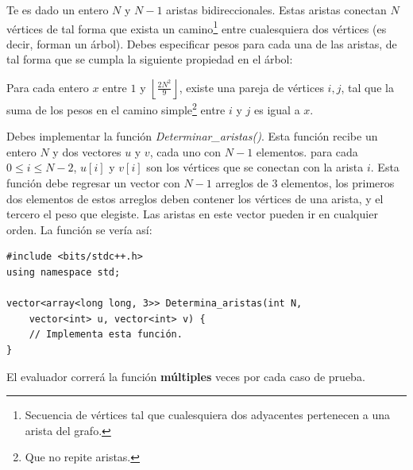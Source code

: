 \documentclass[12pt]{scrartcl}
\begin{document}
    
    
    \vspace{10pt}

    
    
        Te es dado un entero $N$ y $N - 1$ aristas bidireccionales. Estas aristas conectan $N$ vértices de tal forma que exista un camino\footnote{Secuencia de vértices tal que cualesquiera dos adyacentes pertenecen a una arista del grafo.} entre cualesquiera dos vértices (es decir, forman un árbol). Debes especificar pesos para cada una de las aristas, de tal forma que se cumpla la siguiente propiedad en el árbol:
        
        Para cada entero $x$ entre $1$ y $\left\lfloor \frac{2N^2}{9} \right\rfloor$, existe una pareja de vértices $i, j$, tal que la suma de los pesos en el camino simple\footnote{Que no repite aristas.} entre $i$ y $j$ es igual a $x$.
    

        Debes implementar la función \textit{Determinar\_aristas()}. Esta función recibe un entero $N$ y dos vectores $u$ y $v$, cada uno con $N - 1$ elementos. para cada $0 \le i \le N - 2$, $u[i]$ y $v[i]$ son los vértices que se conectan con la arista $i$. Esta función debe regresar un vector con $N - 1$ arreglos de 3 elementos, los primeros dos elementos de estos arreglos deben contener los vértices de una arista, y el tercero el peso que elegiste. Las aristas en este vector pueden ir en cualquier orden.
        La función se vería así:

\begin{verbatim}
#include <bits/stdc++.h>
using namespace std;

vector<array<long long, 3>> Determina_aristas(int N,
    vector<int> u, vector<int> v) {
    // Implementa esta función.
}
\end{verbatim}

    El evaluador correrá la función \textbf{múltiples} veces por cada caso de prueba.

    
\end{document}
